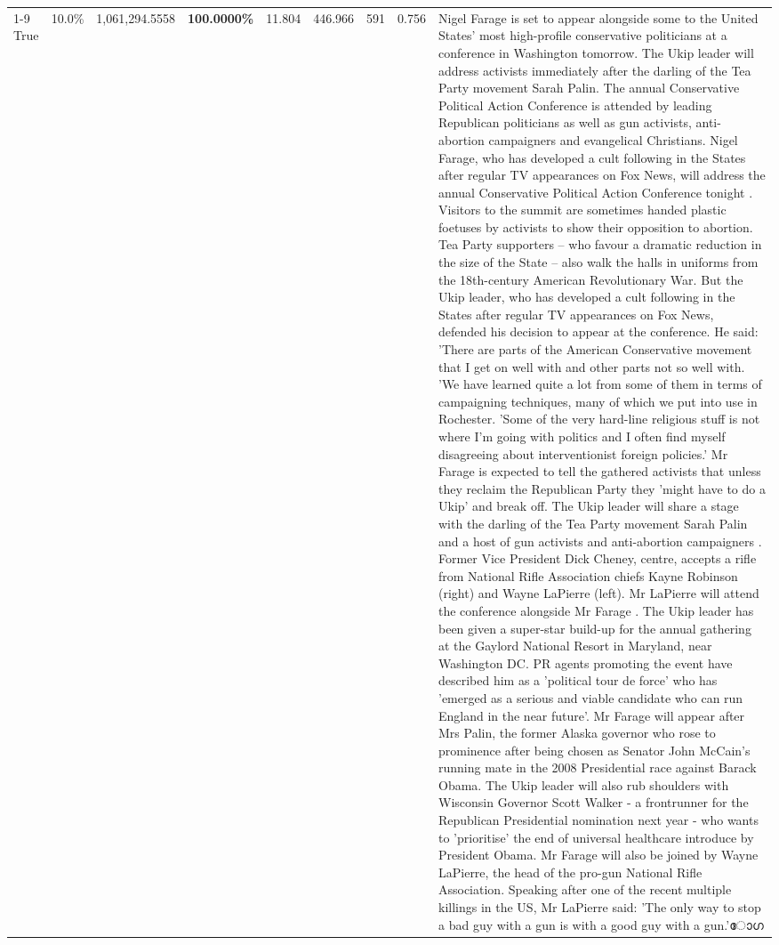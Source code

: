 \begin{table}[H]
\begin{tabular}{lllrlllll}
\cline{1-9}
True & 10.0\% & 1,061,294.5558 & \bfseries \color{red} 100.0000\% & 11.804 & 446.966 & 591 & 0.756 & Nigel Farage is set to appear alongside some to the United States' most high-profile conservative politicians at a conference in Washington tomorrow. The Ukip leader will address activists immediately after the darling of the Tea Party movement Sarah Palin. The annual Conservative Political Action Conference is attended by leading Republican politicians as well as gun activists, anti-abortion campaigners and evangelical Christians. Nigel Farage, who has developed a cult following in the States after regular TV appearances on Fox News, will address the annual Conservative Political Action Conference tonight . Visitors to the summit are sometimes handed plastic foetuses by activists to show their opposition to abortion. Tea Party supporters – who favour a dramatic reduction in the size of the State – also walk the halls in uniforms from the 18th-century American Revolutionary War. But the Ukip leader, who has developed a cult following in the States after regular TV appearances on Fox News, defended his decision to appear at the conference. He said: 'There are parts of the American Conservative movement that I get on well with and other parts not so well with. 'We have learned quite a lot from some of them in terms of campaigning techniques, many of which we put into use in Rochester. 'Some of the very hard-line religious stuff is not where I'm going with politics and I often find myself disagreeing about interventionist foreign policies.' Mr Farage is expected to tell the gathered activists that unless they reclaim the Republican Party they 'might have to do a Ukip' and break off. The Ukip leader will share a stage with the darling of the Tea Party movement Sarah Palin and a host of gun activists and anti-abortion campaigners . Former Vice President Dick Cheney, centre, accepts a rifle from National Rifle Association chiefs Kayne Robinson (right) and Wayne LaPierre (left). Mr LaPierre will attend the conference alongside Mr Farage . The Ukip leader has been given a super-star build-up for the annual gathering at the Gaylord National Resort in Maryland, near Washington DC. PR agents promoting the event have described him as a 'political tour de force' who has 'emerged as a serious and viable candidate who can run England in the near future'. Mr Farage will appear after Mrs Palin, the former Alaska governor who rose to prominence after being chosen as Senator John McCain's running mate in the 2008 Presidential race against Barack Obama. The Ukip leader will also rub shoulders with Wisconsin Governor Scott Walker - a frontrunner for the Republican Presidential nomination next year - who wants to 'prioritise' the end of universal healthcare introduce by President Obama. Mr Farage will also be joined by Wayne LaPierre, the head of the pro-gun National Rifle Association. Speaking after one of the recent multiple killings in the US, Mr LaPierre said: 'The only way to stop a bad guy with a gun is with a good guy with a gun.'ോഗ \\

\end{tabular}
\end{table}
